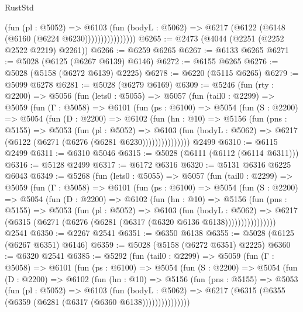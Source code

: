 \begin{lexlean}{RustStd}
\begin{coremodule}
                        (fun (pl : @5052) =>
                        @6103
                          (fun (bodyL : @5062) =>
                          @6217 (@6122 (@6148 (@6160 (@6224 @6230))))))))))))))))
@6265 := @2473 (@4044 (@2251 (@2252 @2522 @2219) @2261))
@6266 := @6259 @6265
@6267 := @6133 @6265
@6271 := @5028 (@6125 (@6267 @6139) @6146)
@6272 := @6155 @6265
@6276 := @5028 (@5158 (@6272 @6139) @2225)
@6278 := @6220 (@5115 @6265)
@6279 := @5099 @6278
@6281 := @5028 (@6279 @6169)
@6309 := @5246
    (fun (rty : @2200) =>
    @5056
      (fun (lets0 : @5055) =>
      @5057
        (fun (tail0 : @2299) =>
        @5059
          (fun (Γ : @5058) =>
          @6101
            (fun (ps : @6100) =>
            @5054
              (fun (S : @2200) =>
              @5054
                (fun (D : @2200) =>
                @6102
                  (fun (hn : @10) =>
                  @5156
                    (fun (pns : @5155) =>
                    @5053
                      (fun (pl : @5052) =>
                      @6103
                        (fun (bodyL : @5062) =>
                        @6217 (@6122 (@6271 (@6276 (@6281 @6230)))))))))))))))
    @2499
@6310 := @6115 @2499
@6311 := @6310 @5046
@6315 := @5028 (@6111 (@6112 (@6114 @6311)))
@6316 := @5128 @2499
@6317 := @6172 @6316
@6320 := @5131 @6316 @6225 @6043
@6349 := @5268
    (fun (lets0 : @5055) =>
    @5057
      (fun (tail0 : @2299) =>
      @5059
        (fun (Γ : @5058) =>
        @6101
          (fun (ps : @6100) =>
          @5054
            (fun (S : @2200) =>
            @5054
              (fun (D : @2200) =>
              @6102
                (fun (hn : @10) =>
                @5156
                  (fun (pns : @5155) =>
                  @5053
                    (fun (pl : @5052) =>
                    @6103
                      (fun (bodyL : @5062) =>
                      @6217 (@6315 (@6271 (@6276 (@6281 (@6317 (@6320 @6136 @6138))))))))))))))))
    @2541
@6350 := @2267 @2541
@6351 := @6350 @6138
@6355 := @5028 (@6125 (@6267 @6351) @6146)
@6359 := @5028 (@5158 (@6272 @6351) @2225)
@6360 := @6320 @2541
@6385 := @5292
    (fun (tail0 : @2299) =>
    @5059
      (fun (Γ : @5058) =>
      @6101
        (fun (ps : @6100) =>
        @5054
          (fun (S : @2200) =>
          @5054
            (fun (D : @2200) =>
            @6102
              (fun (hn : @10) =>
              @5156
                (fun (pns : @5155) =>
                @5053
                  (fun (pl : @5052) =>
                  @6103
                    (fun (bodyL : @5062) =>
                    @6217 (@6315 (@6355 (@6359 (@6281 (@6317 (@6360 @6138)))))))))))))))

\end{coremodule}
\end{lexlean}
